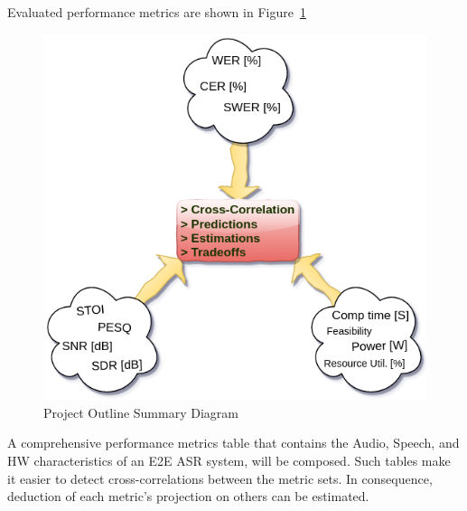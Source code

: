\bigskip

Evaluated performance metrics
are shown in Figure~\ref{fig:metrics_cross_blocks}

\begin{figure}[H]
    \centering
    \includegraphics[width=0.75\linewidth]{Introduction/images/metrics_cross_blocks}
    \caption{Project Outline Summary Diagram}\label{fig:metrics_cross_blocks}
\end{figure}

A comprehensive performance metrics table that contains the Audio,
Speech, and HW characteristics
of an E2E ASR system, will be composed.
Such tables make it easier to detect cross-correlations between the metric sets.
In consequence, 
deduction of each metric's
projection on others can be estimated.






